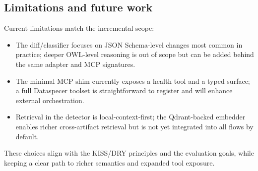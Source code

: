 \subsection{Limitations and future work}
Current limitations match the incremental scope:
\begin{itemize}
  \item The diff/classifier focuses on JSON Schema-level changes most common in practice; deeper OWL-level reasoning is out of scope but can be added behind the same adapter and MCP signatures.
  \item The minimal MCP shim currently exposes a health tool and a typed surface; a full Dataspecer toolset is straightforward to register and will enhance external orchestration.
  \item Retrieval in the detector is local-context-first; the Qdrant-backed embedder enables richer cross-artifact retrieval but is not yet integrated into all flows by default.
\end{itemize}
These choices align with the KISS/DRY principles and the evaluation goals, while keeping a clear path to richer semantics and expanded tool exposure.
